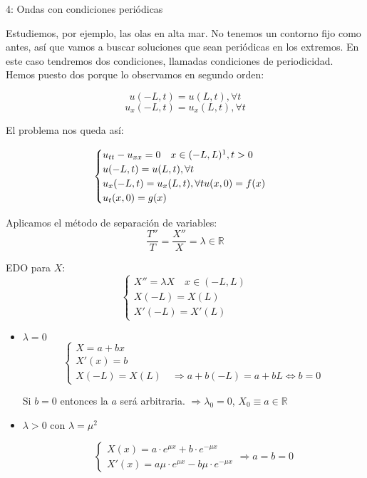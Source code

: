 		\begin{example}{4: Ondas con condiciones periódicas}

			Estudiemos, por ejemplo, las olas en alta mar. No tenemos un contorno fijo como antes, así que vamos a buscar soluciones que sean periódicas en los extremos. En este caso tendremos dos condiciones, llamadas condiciones de periodicidad. Hemos puesto dos porque lo observamos en segundo orden:

			\[u(-L,t) = u(L,t), \forall t\]
			\[u_x(-L,t) = u_x(L,t), \forall t\]

			El problema nos queda así:

			\[  \begin{cases}
				u_{tt} - u_{xx} = 0 \quad x  \in (-L,L)\footnotemark, t>0\\
				u(-L,t) = u(L,t), \forall t\\
				u_x(-L,t) = u_x(L,t), \forall t
				u(x,0) = f(x) \\
				u_t(x,0) = g(x)
				\end{cases}
			\]

			Aplicamos el método de separación de variables:
			\[ \frac{T''}{T} = \frac{X''}{X} = \lambda \in \mathbb{R}\]

			EDO para $X$:
			\[\left\{\begin{array}{l}
				X'' = \lambda X \quad x \in (-L,L) \\
				X(-L) = X(L) \\
				X'(-L) = X'(L)
			\end{array}
			\right. \]

			\begin{itemize}
				\item $\lambda = 0$
					\[\left\{\begin{array}{l}
						X = a+bx \\
						X'(x) = b \\
						X(-L) = X(L) \quad \Rightarrow a + b(-L) = a + bL \Leftrightarrow b = 0
					\end{array}
					\right. \]

					Si $b = 0$ entonces la $a$ será arbitraria. $\Rightarrow \lambda_0 = 0$, $ X_0 \equiv a \in \mathbb{R}$


				\item $\lambda > 0$ con $\lambda = \mu^2$

					\[\begin{cases}
						X(x) = a\cdot e^{\mu x} + b \cdot e^{-\mu x} \\
						X'(x) = a\mu \cdot e^{\mu x} - b \mu \cdot e^{-\mu x}
					\end{cases}
					\Rightarrow a = b = 0 \]



\end{itemize}
\end{example}
